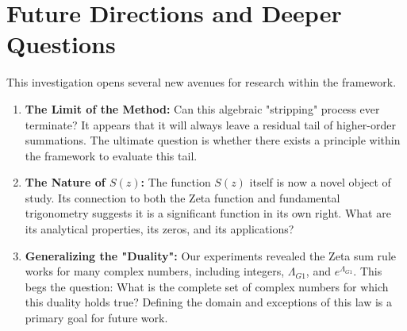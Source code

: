 \documentclass[11pt]{article}
\begin{document}
\section{Future Directions and Deeper Questions}
This investigation opens several new avenues for research within the framework.
\begin{enumerate}
    \item \textbf{The Limit of the Method:} Can this algebraic "stripping" process ever terminate? It appears that it will always leave a residual tail of higher-order summations. The ultimate question is whether there exists a principle within the framework to evaluate this tail.
    \item \textbf{The Nature of $S(z)$:} The function $S(z)$ itself is now a novel object of study. Its connection to both the Zeta function and fundamental trigonometry suggests it is a significant function in its own right. What are its analytical properties, its zeros, and its applications?
    \item \textbf{Generalizing the "Duality":} Our experiments revealed the Zeta sum rule works for many complex numbers, including integers, $\Lambda_{G1}$, and $e^{\Lambda_{G1}}$. This begs the question: What is the complete set of complex numbers for which this duality holds true? Defining the domain and exceptions of this law is a primary goal for future work.
\end{enumerate}
\end{document}
